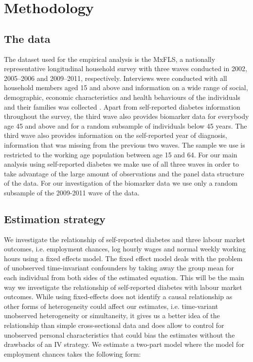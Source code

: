 \section{\noindent \label{sec:Methodology}Methodology}
\subsection{The data}
The dataset used for the empirical analysis is the \acf{MxFLS}, a nationally representative longitudinal household survey with three waves conducted in 2002, 2005--2006 and 2009--2011, respectively.
Interviews were conducted with all household members aged 15 and above
and information on a wide range of social, demographic, economic characteristics
and health behaviours of the individuals and their families was collected
\citep{Rubalcava2013}. Apart from self-reported diabetes information
throughout the survey, the third wave also provides biomarker data
for everybody age 45 and above and for a random subsample of individuals
below 45 years. The third wave also provides information on the self-reported
year of diagnosis, information that was missing from the previous
two waves. The sample we use is restricted to the working age population
between age 15 and 64. For our main analysis using self-reported diabetes
we make use of all three waves in order to take advantage of the large
amount of observations and the panel data structure of the data. For our investigation of the biomarker data we use only a random subsample of the 2009-2011 wave of the data.
\subsection{Estimation strategy}

We investigate the relationship of self-reported diabetes and three labour
market outcomes, i.e. employment chances, log hourly wages  and normal
weekly working hours using a fixed effects model. The fixed effect model deals with the problem of unobserved time-invariant
confounders by taking away the group mean for each individual from
both sides of the estimated equation. This will be the main way we investigate the relationship of self-reported
diabetes with labour market outcomes. While using fixed-effects
does not identify a causal relationship as other forms of heterogeneity
could affect our estimates, i.e. time-variant unobserved heterogeneity
or simultaneity, it gives us a better idea of the relationship than
simple cross-sectional data and does allow to control for unobserved
personal characteristics that could bias the estimates without the
drawbacks of an \ac{IV} strategy. We estimate a two-part model where
the model for employment chances takes the following form:


